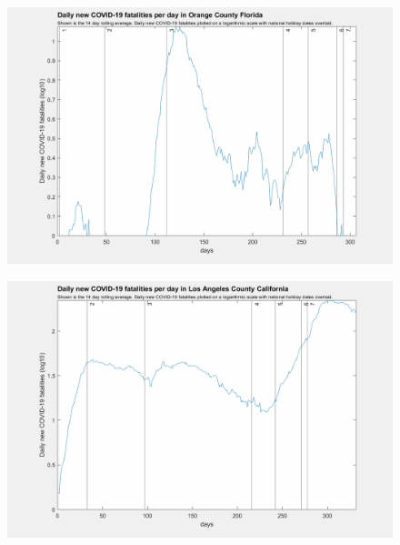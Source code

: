 \documentclass[]{article}
\begin{document}
\begin{figure}[!h]
	\includegraphics[width=\linewidth]{images/orange_fatalities_holiday_log.png}
	\caption{}
	\label{fig:images/orange_fatalities_holiday_logLabel}
\end{figure}

\begin{figure}[!h]
	\includegraphics[width=\linewidth]{images/los_angeles_fatalities_holiday_log.png}
	\caption{}
	\label{fig:images/los_angeles_fatalities_holiday_logLabel}
\end{figure}
\end{document}
